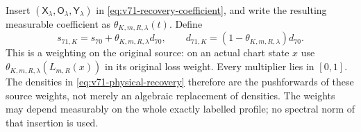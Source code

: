 Insert $(\mathsf X_\lambda,\mathsf O_\lambda,\mathsf Y_\lambda)$
in \eqref{eq:v71-recovery-coefficient}, and write the resulting
measurable coefficient as $\theta_{K,m,R,\lambda}(t)$. Define
\begin{equation}\label{eq:v71-physical-recovery}
 s_{71,K}=s_{70}+\theta_{K,m,R,\lambda}d_{70},\qquad
 d_{71,K}=(1-\theta_{K,m,R,\lambda})d_{70}.
\end{equation}
This is a weighting on the original source: on an actual chart state
$x$ use $\theta_{K,m,R,\lambda}(L_{m,R}(x))$ in its original
loss weight. Every multiplier lies in $[0,1]$. The densities in
\eqref{eq:v71-physical-recovery} therefore are the pushforwards of
these source weights, not merely an algebraic replacement of densities.
The weights may depend measurably on the whole exactly labelled
profile; no spectral norm of that insertion is used.

